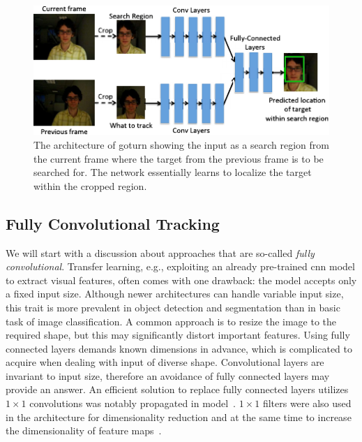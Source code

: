 \begin{figure}[t]
    \centerline{\includegraphics[width=0.7\linewidth]{figures/theoretical_foundations/goturn_framework.pdf}}
    \caption[\Gls{goturn} architecture]{The architecture of \gls{goturn} showing the input as a search region from the current frame where the target from the previous frame is to be searched for. The network essentially learns to localize the target within the cropped region. }
    \label{fig:GOTURNFramework}
\end{figure}

\subsection{Fully Convolutional Tracking}
\label{ssec:FullyConvolutionalTracking}

We will start with a discussion about approaches that are so-called \emph{fully convolutional}. Transfer learning, e.g., exploiting an already pre-trained \gls{cnn} model to extract visual features, often comes with one drawback: the model accepts only a fixed input size. Although newer architectures can handle variable input size, this trait is more prevalent in object detection and segmentation than in basic task of image classification. A common approach is to resize the image to the required shape, but this may significantly distort important features. Using fully connected layers demands known dimensions in advance, which is complicated to acquire when dealing with input of diverse shape. Convolutional layers are invariant to input size, therefore an avoidance of fully connected layers may provide an answer. An efficient solution to replace fully connected layers utilizes $1 \times 1$ convolutions was notably propagated in  model~\cite{lin2014netinnet}. $1 \times 1$ filters were also used in the  architecture for dimensionality reduction and at the same time to increase the dimensionality of feature maps~\cite{szegedy2015inception}.

